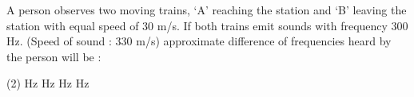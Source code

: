 \item A person observes two moving trains, ‘A’ reaching the station and ‘B’ leaving the station with equal speed of 30 m/s. If both trains emit sounds with frequency 300 Hz. (Speed of sound : 330 m/s) approximate difference of frequencies heard by the person will be :
    \begin{tasks}(2)
         Hz
         Hz
         Hz
         Hz
    \end{tasks}